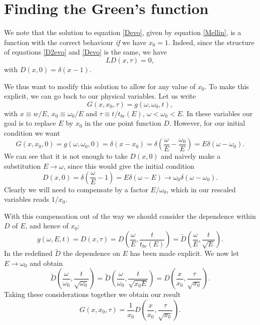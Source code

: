 \documentclass[a4paper,12pt]{article}
\numberwithin{equation}{section}
\begin{document}
\section{Finding the Green's function}
We note that the solution to equation \eqref{Devo}, given by equation \eqref{Mellin}, is a function with the correct behaviour \emph{if} we have $x_0=1$. Indeed, since the structure of equations \eqref{D2evo} and \eqref{Devo} is the same, we have
\begin{equation}
L D(x,\tau)=0,
\end{equation}
with $D(x,0)=\delta(x-1)$.


We thus want to modify this solution to allow for any value of $x_0$. To make this explicit, we can go back to our physical variables. Let us write
\begin{equation}
G(x,x_0,\tau)=g(\omega, \omega_0,t),
\end{equation}
with $x \equiv w/E$, $x_0 \equiv \omega_0/E$ and $\tau \equiv t/t_{br}(E)$, $\omega < \omega_0 <E$. In these variables our goal is to replace $E$ by $x_0$ in the one point function $D$. However, for our initial condition we want
\begin{equation}
G(x,x_0,0)=g(\omega,\omega_0,0)=\delta(x-x_0)=\delta \left( \frac{\omega}{E} - \frac{\omega_0}{E}\right)=E\delta(\omega-\omega_0).
\end{equation}
We can see that it is not enough to take $D(x,0)$ and naively make a substitution $E\rightarrow \omega$, since this would give the initial condition
\begin{equation}
D(x,0)=\delta\left(\frac{\omega}{E}-1\right)=E\delta(\omega-E)\rightarrow \omega_0 \delta(\omega-\omega_0).
\end{equation}
Clearly we will need to compensate by a factor $E/\omega_0$, which in our rescaled variables reads $1/x_0$.

With this compensation out of the way we should consider the dependence within $D$ of $E$, and hence of $x_0$:
\begin{equation}
g(\omega,E,t)=D(x,\tau)=D\left( \frac{\omega}{E},\frac{t}{t_{br}(E)}\right)=\tilde{D} \left( \frac{\omega}{E},\frac{t}{\sqrt{E}}\right).
\end{equation}
In the redefined $\tilde{D}$ the dependence on $E$ has been made explicit. We now let $E\rightarrow \omega_0$ and obtain
\begin{equation}
\tilde{D}\left( \frac{\omega}{\omega_0},\frac{t}{\sqrt{\omega_0}}\right)=\tilde{D}\left( \frac{\omega}{\omega_0},\frac{t}{\sqrt{x_0 E}}\right)=D\left( \frac{x}{x_0},\frac{\tau}{\sqrt{x_0}}\right).
\end{equation}
Taking these considerations together we obtain our result
\begin{equation}
G(x,x_0,\tau) = \frac{1}{x_0} D\left(\frac{x}{x_0},\frac{\tau}{\sqrt{x_0}}\right).
\end{equation}
\end{document}
